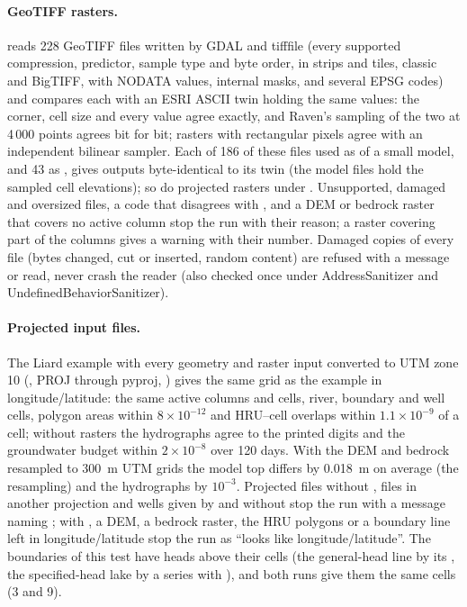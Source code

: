 \paragraph{GeoTIFF rasters.}  reads 228 GeoTIFF files written by GDAL and tifffile
(every supported compression, predictor, sample type and byte order, in strips and tiles, classic and BigTIFF, with
NODATA values, internal masks,  and several EPSG codes) and compares each with an ESRI ASCII twin holding the same
values: the corner, cell size and every value agree exactly, and Raven's sampling of the two at 4\,000 points agrees bit for
bit; rasters with rectangular pixels agree with an independent bilinear sampler. Each of 186 of these files used as  of a small model, and 43 as , gives outputs
byte-identical to its twin (the model files hold the sampled cell elevations); so do projected rasters under
. Unsupported, damaged and oversized files, a code that disagrees with , and a DEM or bedrock
raster that covers no active column stop the run with their reason; a raster covering part of the columns gives a warning
with their number. Damaged copies of every file (bytes changed, cut or inserted, random content) are refused with a message
or read, never crash the reader (also checked once under AddressSanitizer and UndefinedBehaviorSanitizer).

\paragraph{Projected input files.} The Liard example with every geometry and raster input converted to UTM zone 10
(, PROJ through pyproj, ) gives the same grid as the example in
longitude/latitude: the same active columns and cells, river, boundary and well cells, polygon areas within
$8\times10^{-12}$ and HRU--cell overlaps within $1.1\times10^{-9}$ of a cell; without rasters the hydrographs agree to the
printed digits and the groundwater budget within $2\times10^{-8}$ over 120 days. With the DEM and bedrock resampled to
300~m UTM grids the model top differs by 0.018~m on average (the resampling) and the hydrographs by $10^{-3}$. Projected
files without , files in another projection and wells given by  and  without 
stop the run with a message naming ; with , a DEM, a bedrock raster, the HRU polygons or a
boundary line left in longitude/latitude stop the run as ``looks like longitude/latitude''. The boundaries of this test have
heads above their cells (the general-head line by its , the specified-head lake by a  series
with ), and both runs give them the same cells (3 and 9).

